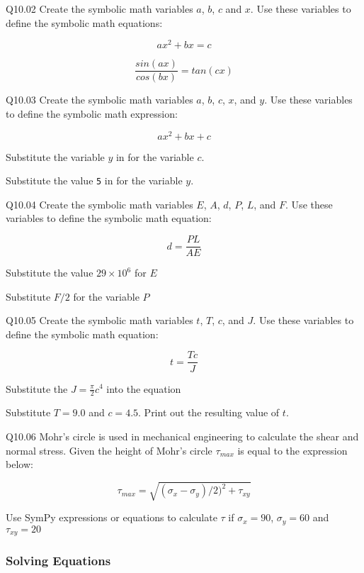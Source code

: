 \documentclass{book}
\newcommand{\passthrough}[1]{#1}
\begin{document}
Q10.02 Create the symbolic math variables \(a\), \(b\), \(c\) and \(x\).
Use these variables to define the symbolic math equations:

\[ ax^2 + bx = c \]

\[ \frac{sin(ax)}{cos(bx)} = tan(cx) \]

Q10.03 Create the symbolic math variables \(a\), \(b\), \(c\), \(x\),
and \(y\). Use these variables to define the symbolic math expression:

\[ ax^2 + bx + c \]

Substitute the variable \(y\) in for the variable \(c\).

Substitute the value \passthrough{\lstinline!5!} in for the variable
\(y\).

Q10.04 Create the symbolic math variables \(E\), \(A\), \(d\), \(P\),
\(L\), and \(F\). Use these variables to define the symbolic math
equation:

\[ d = \frac{PL}{AE} \]

Substitute the value \(29 \times 10^6\) for \(E\)

Substitute \(F/2\) for the variable \(P\)

Q10.05 Create the symbolic math variables \(t\), \(T\), \(c\), and
\(J\). Use these variables to define the symbolic math equation:

\[ t = \frac{Tc}{J} \]

Substitute the \(J = \frac{\pi}{2}c^4\) into the equation

Substitute \(T=9.0\) and \(c=4.5\). Print out the resulting value of
\(t\).

Q10.06 Mohr's circle is used in mechanical engineering to calculate the
shear and normal stress. Given the height of Mohr's circle
\(\tau_{max}\) is equal to the expression below:

\[ \tau_{max} = \sqrt{(\sigma_x - \sigma_y)/2)^2 + \tau_{xy}} \]

Use SymPy expressions or equations to calculate \(\tau\) if
\(\sigma_x = 90\), \(\sigma_y = 60\) and \(\tau_{xy} = 20\)
    




    
        \hypertarget{solving-equations}{%
\subsubsection{Solving Equations}\label{solving-equations}}
    
\end{document}
